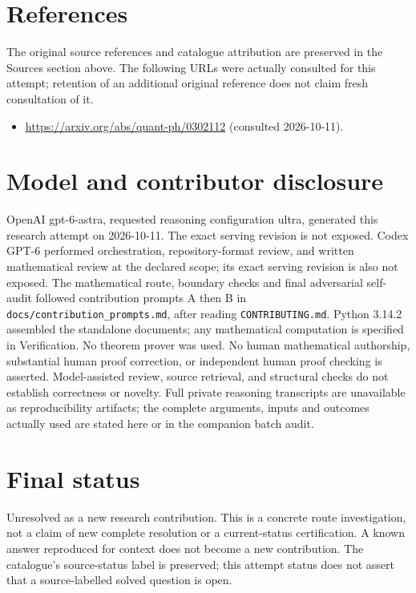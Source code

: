 \documentclass[11pt]{article}
\begin{document}
\section{References}
The original source references and catalogue attribution are preserved in the
Sources section above. The following URLs were actually consulted for this attempt;
retention of an additional original reference does not claim fresh consultation of it.
\begin{itemize}
\item \url{https://arxiv.org/abs/quant-ph/0302112} (consulted 2026-10-11). 
\end{itemize}
\section{Model and contributor disclosure}
OpenAI gpt-6-astra, requested reasoning configuration ultra, generated this research
attempt on 2026-10-11. The exact serving revision is not exposed. Codex GPT-6
performed orchestration, repository-format review, and written mathematical review at the declared scope; its exact serving revision
is also not exposed. The mathematical route, boundary checks and final adversarial
self-audit followed contribution prompts A then B in
\texttt{docs/contribution\_prompts.md}, after reading \texttt{CONTRIBUTING.md}.
Python 3.14.2 assembled the standalone documents; any mathematical computation is
specified in Verification. No theorem prover was used. No human mathematical
authorship, substantial human proof correction, or independent human proof checking
is asserted. Model-assisted review, source retrieval, and structural checks do not
establish correctness or novelty. Full private reasoning transcripts are unavailable
as reproducibility artifacts; the complete arguments, inputs and outcomes actually
used are stated here or in the companion batch audit.
\section{Final status}
Unresolved as a new research contribution. This is a concrete route investigation,
not a claim of new complete resolution or a current-status certification. A known
answer reproduced for context does not become a new contribution. The catalogue's
source-status label is preserved; this attempt status does not assert that a
source-labelled solved question is open.
\end{document}
